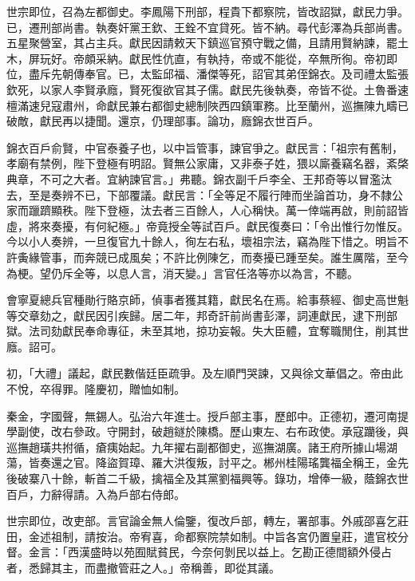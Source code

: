 \begin{pinyinscope}
世宗即位，召為左都御史。李鳳陽下刑部，程貴下都察院，皆改詔獄，獻民力爭。已，遷刑部尚書。執奏奸黨王欽、王銓不宜貸死。皆不納。尋代彭澤為兵部尚書。五星聚營室，其占主兵。獻民因請敕天下鎮巡官預守戰之備，且請用賢納諫，罷土木，屏玩好。帝頗采納。獻民性伉直，有執持，帝或不能從，卒無所徇。帝初即位，盡斥先朝傳奉官。已，太監邱福、潘傑等死，詔官其弟侄錦衣。及司禮太監張欽死，以家人李賢承廕，賢死復欲官其子儒。獻民先後執奏，帝皆不從。土魯番速檀滿速兒寇肅州，命獻民兼右都御史總制陜西四鎮軍務。比至蘭州，巡撫陳九疇已破敵，獻民再以捷聞。還京，仍理部事。論功，廕錦衣世百戶。

錦衣百戶俞賢，中官泰養子也，以中旨管事，諫官爭之。獻民言：「祖宗有舊制，孝廟有禁例，陛下登極有明詔。賢無公家庸，又非泰子姓，猥以廝養竊名器，紊棨典章，不可之大者。宜納諫官言。」弗聽。錦衣副千戶李全、王邦奇等以冒濫汰去，至是奏辨不已，下部覆議。獻民言：「全等足不履行陣而坐論首功，身不隸公家而躐躋顯秩。陛下登極，汰去者三百餘人，人心稱快。萬一倖端再啟，則前詔皆虛，將來奏擾，有何紀極。」帝竟授全等試百戶。獻民復奏曰：「令出惟行勿惟反。今以小人奏辨，一旦復官九十餘人，徇左右私，壞祖宗法，竊為陛下惜之。明旨不許夤緣管事，而奔競已成風矣；不許比例陳乞，而奏擾已踵至矣。誰生厲階，至今為梗。望仍斥全等，以息人言，消天變。」言官任洛等亦以為言，不聽。

會寧夏總兵官種勛行賂京師，偵事者獲其籍，獻民名在焉。給事蔡經、御史高世魁等交章劾之，獻民因引疾歸。居二年，邦奇訐前尚書彭澤，詞連獻民，逮下刑部獄。法司劾獻民奉命專征，未至其地，掠功妄報。失大臣體，宜奪職閒住，削其世廕。詔可。

初，「大禮」議起，獻民數偕廷臣疏爭。及左順門哭諫，又與徐文華倡之。帝由此不悅，卒得罪。隆慶初，贈恤如制。

秦金，字國聲，無錫人。弘治六年進士。授戶部主事，歷郎中。正德初，遷河南提學副使，改右參政。守開封，破趙鐩於陳橋。歷山東左、右布政使。承寇躪後，與巡撫趙璜共拊循，瘡痍始起。九年擢右副都御史，巡撫湖廣。諸王府所據山場湖蕩，皆奏還之官。降盜賀璋、羅大洪復叛，討平之。郴州桂陽瑤龔福全稱王，金先後破寨八十餘，斬首二千級，擒福全及其黨劉福興等。錄功，增俸一級，蔭錦衣世百戶，力辭得請。入為戶部右侍郎。

世宗即位，改吏部。言官論金無人倫鑒，復改戶部，轉左，署部事。外戚邵喜乞莊田，金述祖制，請按治。帝宥喜，命都察院禁如制。中旨各宮仍置皇莊，遣官校分督。金言：「西漢盛時以苑囿賦貧民，今奈何剝民以益上。乞勘正德間額外侵占者，悉歸其主，而盡撤管莊之人。」帝稱善，即從其議。


\end{pinyinscope}
